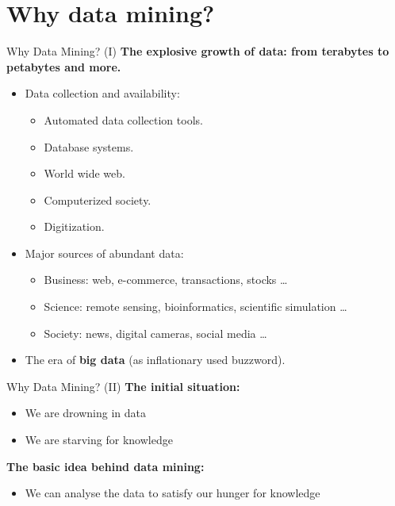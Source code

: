 \section{Why data mining?}

\begin{frame}{Why Data Mining? (I)}
	\textbf{The explosive growth of data: from terabytes to petabytes and
		more.}\\
	\begin{itemize}
		\item Data collection and availability:
		      \begin{itemize}
			      \item Automated data collection tools.
			      \item Database systems.
			      \item World wide web.
			      \item Computerized society.
			      \item Digitization.
		      \end{itemize}
		\item Major sources of abundant data:
		      \begin{itemize}
			      \item Business: web, e-commerce, transactions, stocks \ldots
			      \item Science: remote sensing, bioinformatics, scientific
			            simulation \ldots
			      \item Society: news, digital cameras, social media \ldots
		      \end{itemize}
		\item The era of \textbf{big data} (as inflationary used buzzword).
	\end{itemize}
\end{frame}

\begin{frame}{Why Data Mining? (II)}
	\textbf{The initial situation:}
	\begin{itemize}
		\item We are drowning in  data
		\item We are starving for knowledge
	\end{itemize}
	\textbf{The basic idea behind data mining:}
	\begin{itemize}
		\item We can analyse the data to satisfy our hunger for knowledge
	\end{itemize}
\end{frame}

